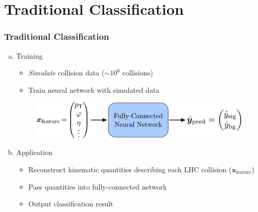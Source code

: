 \documentclass[14pt, t]{beamer}
\renewcommand{\vec}[1]{\bm{#1}}
\begin{document}
\section{Traditional Classification}

\begin{frame}
    \frametitle{Traditional Classification}
    \begin{enumerate}[(a)]
    
        \item Training
        \begin{itemize}
        
            \item \textit{Simulate} collision data ($ \sim 10^{6} $ collisions)

            \item Train neural network with simulated data
        
        \end{itemize}
        \pause
        \vspace{1mm}
        \begin{center}
        \begin{figure}[htb!]
            \hspace{-10mm} %
            \includegraphics[width=\linewidth]{vector/fcn-in-out.pdf}
        \end{figure}    
        \end{center}
        
        \item Application
        \begin{itemize}
        
            \item Reconstruct kinematic quantities describing each LHC collision ($ \vec{x}_{\text{feature}} $)

            \item Pass quantities into fully-connected network

            \item Output classification result
        
        \end{itemize}
    
    \end{enumerate}
       
\end{frame}
\end{document}
